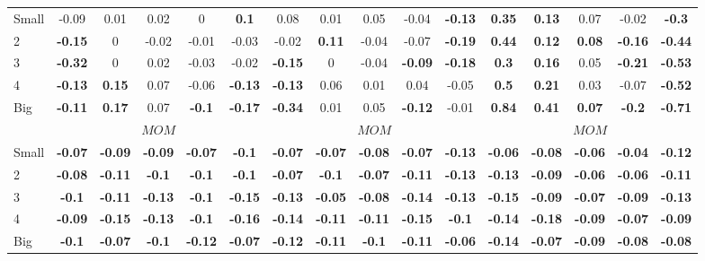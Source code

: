 \begin{table}[H]
\begin{tabular}{lccccc|ccccc|ccccc}
Small & -0.09 & 0.01 & 0.02 & 0 & \textbf{0.1} & 0.08 & 0.01 & 0.05 & -0.04 & \textbf{-0.13} & \textbf{0.35} & \textbf{0.13} & 0.07 & -0.02 & \textbf{-0.3} \\
2 & \textbf{-0.15} & 0 & -0.02 & -0.01 & -0.03 & -0.02 & \textbf{0.11} & -0.04 & -0.07 & \textbf{-0.19} & \textbf{0.44} & \textbf{0.12} & \textbf{0.08} & \textbf{-0.16} & \textbf{-0.44} \\
3 & \textbf{-0.32} & 0 & 0.02 & -0.03 & -0.02 & \textbf{-0.15} & 0 & -0.04 & \textbf{-0.09} & \textbf{-0.18} & \textbf{0.3} & \textbf{0.16} & 0.05 & \textbf{-0.21} & \textbf{-0.53} \\
4 & \textbf{-0.13} & \textbf{0.15} & 0.07 & -0.06 & \textbf{-0.13} & \textbf{-0.13} & 0.06 & 0.01 & 0.04 & -0.05 & \textbf{0.5} & \textbf{0.21} & 0.03 & -0.07 & \textbf{-0.52} \\
Big & \textbf{-0.11} & \textbf{0.17} & 0.07 & \textbf{-0.1} & \textbf{-0.17} & \textbf{-0.34} & 0.01 & 0.05 & \textbf{-0.12} & -0.01 & \textbf{0.84} & \textbf{0.41} & \textbf{0.07} & \textbf{-0.2} & \textbf{-0.71} \\
 & \multicolumn{5}{c|}{$MOM$} & \multicolumn{5}{c|}{$MOM$} & \multicolumn{5}{c}{$MOM$} \\
Small & \textbf{-0.07} & \textbf{-0.09} & \textbf{-0.09} & \textbf{-0.07} & \textbf{-0.1} & \textbf{-0.07} & \textbf{-0.07} & \textbf{-0.08} & \textbf{-0.07} & \textbf{-0.13} & \textbf{-0.06} & \textbf{-0.08} & \textbf{-0.06} & \textbf{-0.04} & \textbf{-0.12} \\
2 & \textbf{-0.08} & \textbf{-0.11} & \textbf{-0.1} & \textbf{-0.1} & \textbf{-0.1} & \textbf{-0.07} & \textbf{-0.1} & \textbf{-0.07} & \textbf{-0.11} & \textbf{-0.13} & \textbf{-0.13} & \textbf{-0.09} & \textbf{-0.06} & \textbf{-0.06} & \textbf{-0.11} \\
3 & \textbf{-0.1} & \textbf{-0.11} & \textbf{-0.13} & \textbf{-0.1} & \textbf{-0.15} & \textbf{-0.13} & \textbf{-0.05} & \textbf{-0.08} & \textbf{-0.14} & \textbf{-0.13} & \textbf{-0.15} & \textbf{-0.09} & \textbf{-0.07} & \textbf{-0.09} & \textbf{-0.13} \\
4 & \textbf{-0.09} & \textbf{-0.15} & \textbf{-0.13} & \textbf{-0.1} & \textbf{-0.16} & \textbf{-0.14} & \textbf{-0.11} & \textbf{-0.11} & \textbf{-0.15} & \textbf{-0.1} & \textbf{-0.14} & \textbf{-0.18} & \textbf{-0.09} & \textbf{-0.07} & \textbf{-0.09} \\
Big & \textbf{-0.1} & \textbf{-0.07} & \textbf{-0.1} & \textbf{-0.12} & \textbf{-0.07} & \textbf{-0.12} & \textbf{-0.11} & \textbf{-0.1} & \textbf{-0.11} & \textbf{-0.06} & \textbf{-0.14} & \textbf{-0.07} & \textbf{-0.09} & \textbf{-0.08} & \textbf{-0.08} \\

\end{tabular}
\end{table}
